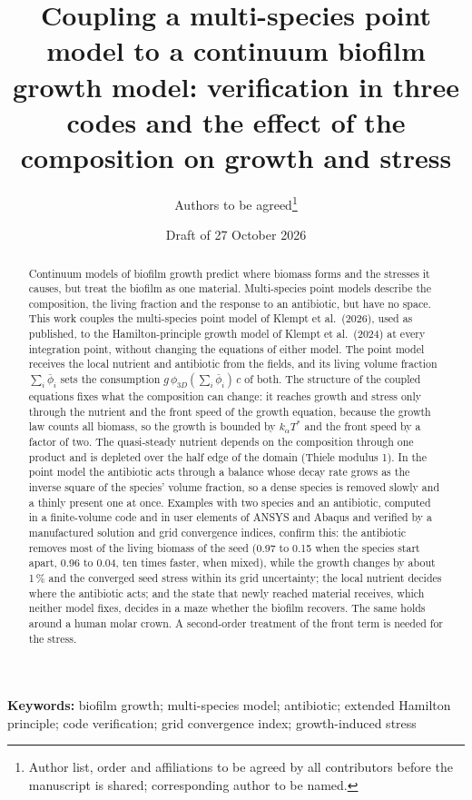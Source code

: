 \documentclass[11pt,a4paper]{article}
\title{Coupling a multi-species point model to a continuum biofilm growth model: verification in three codes and the effect of the composition on growth and stress}
\author{Authors to be agreed\thanks{Author list, order and affiliations to be agreed by all contributors before the manuscript is shared; corresponding author to be named.}}
\date{Draft of 27 October 2026}
\begin{document}
\maketitle

\begin{abstract}
Continuum models of biofilm growth predict where biomass forms and the stresses it causes, but treat the biofilm as one material. Multi-species point models describe the composition, the living fraction and the response to an antibiotic, but have no space. This work couples the multi-species point model of Klempt et al.\ (2026), used as published, to the Hamilton-principle growth model of Klempt et al.\ (2024) at every integration point, without changing the equations of either model. The point model receives the local nutrient and antibiotic from the fields, and its living volume fraction $\sum_i\bar\phi_i$ sets the consumption $g\,\phi_{3D}(\sum_i\bar\phi_i)\,c$ of both. The structure of the coupled equations fixes what the composition can change: it reaches growth and stress only through the nutrient and the front speed of the growth equation, because the growth law counts all biomass, so the growth is bounded by $k_\alpha T^*$ and the front speed by a factor of two. The quasi-steady nutrient depends on the composition through one product and is depleted over the half edge of the domain (Thiele modulus 1). In the point model the antibiotic acts through a balance whose decay rate grows as the inverse square of the species' volume fraction, so a dense species is removed slowly and a thinly present one at once. Examples with two species and an antibiotic, computed in a finite-volume code and in user elements of ANSYS and Abaqus and verified by a manufactured solution and grid convergence indices, confirm this: the antibiotic removes most of the living biomass of the seed (0.97 to 0.15 when the species start apart, 0.96 to 0.04, ten times faster, when mixed), while the growth changes by about 1\,\% and the converged seed stress within its grid uncertainty; the local nutrient decides where the antibiotic acts; and the state that newly reached material receives, which neither model fixes, decides in a maze whether the biofilm recovers. The same holds around a human molar crown. A second-order treatment of the front term is needed for the stress.
\end{abstract}

\noindent\textbf{Keywords:} biofilm growth; multi-species model; antibiotic; extended Hamilton principle; code verification; grid convergence index; growth-induced stress
\end{document}
